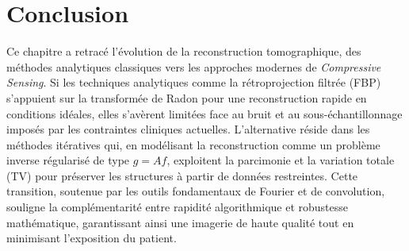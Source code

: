 \section*{Conclusion}
Ce chapitre a retracé l'évolution de la reconstruction tomographique, des méthodes analytiques classiques vers les approches modernes de \textit{Compressive Sensing}. Si les techniques analytiques comme la rétroprojection filtrée (FBP) s'appuient sur la transformée de Radon pour une reconstruction rapide en conditions idéales, elles s'avèrent limitées face au bruit et au sous-échantillonnage imposés par les contraintes cliniques actuelles. L'alternative réside dans les méthodes itératives qui, en modélisant la reconstruction comme un problème inverse régularisé de type $g = Af$, exploitent la parcimonie et la variation totale (TV) pour préserver les structures à partir de données restreintes. Cette transition, soutenue par les outils fondamentaux de Fourier et de convolution, souligne la complémentarité entre rapidité algorithmique et robustesse mathématique, garantissant ainsi une imagerie de haute qualité tout en minimisant l'exposition du patient.